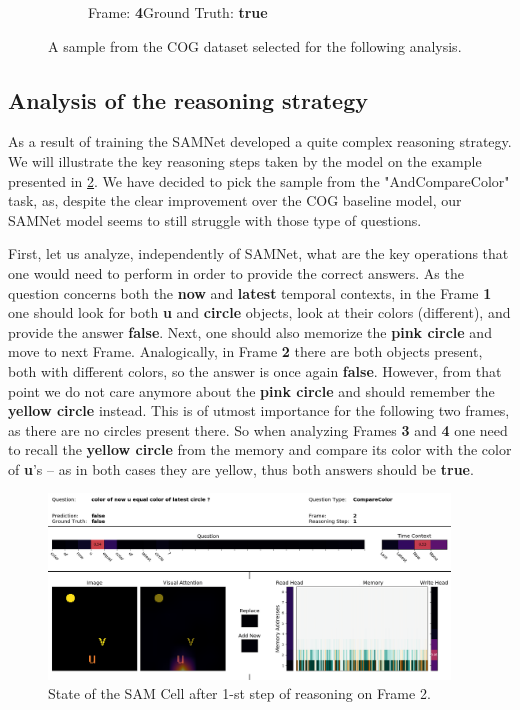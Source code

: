 \begin{figure}[htbp]
\begin{subfigure}{0.25\textwidth}
	\caption{Frame: \textbf{4}\newline Ground Truth: \textbf{true}}
	\label{fig:frame-4}
  \end{subfigure}%
  \hfill\null
  \newline
  \centering
\caption{A sample from the COG dataset selected for the following analysis.} 
\label{fig:example}  
\end{figure}

\subsection{Analysis of the reasoning strategy}
As a result of training the SAMNet developed a quite complex reasoning strategy.
We will illustrate the key reasoning steps taken by the model on the example presented in \cref{fig:example}.
We have decided to pick the sample from the "AndCompareColor" task, as, despite the clear improvement over the COG baseline model, our SAMNet model seems to still struggle with those type of questions.	

First, let us analyze, independently of SAMNet, what are the key operations that one would need to perform in order to provide the correct answers. 
As the question concerns both the \textbf{now} and \textbf{latest} temporal contexts, in the Frame \textbf{1} one should look for both \textbf{u} and \textbf{circle} objects, look at their colors (different), and provide the answer \textbf{false}.
Next, one should also memorize the \textbf{pink circle} and move to next Frame.
Analogically, in Frame \textbf{2} there are both objects present, both with different colors, so the answer is once again \textbf{false}.
However, from that point we do not care anymore about the \textbf{pink circle} and should remember the \textbf{yellow circle} instead.
This is of utmost importance for the following two frames, as there are no circles present there.
So when analyzing Frames \textbf{3} and \textbf{4} one need to recall the \textbf{yellow circle} from the memory and compare its color with the color of \textbf{u}'s -- as in both cases they are yellow, thus  both answers should be \textbf{true}.

\begin{figure}[!h]
	\centering
	\includegraphics[width=0.95\textwidth]{"../img/visualization/experiment_run_20190917_022319/Frame 2 Step 1"}
	\caption{State of the SAM Cell after 1-st step of reasoning on Frame 2.} 
	\label{fig:frame-2-step-1}
\end{figure}

